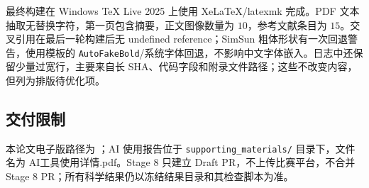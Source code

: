 最终构建在 Windows TeX Live 2025 上使用 XeLaTeX/latexmk 完成。PDF 文本抽取无替换字符，第一页包含摘要，正文图像数量为 $10$，参考文献条目为 $15$。交叉引用在最后一轮构建后无 undefined reference；SimSun 粗体形状有一次回退警告，使用模板的 \texttt{AutoFakeBold}/系统字体回退，不影响中文字体嵌入。日志中还保留少量过宽行，主要来自长 SHA、代码字段和附录文件路径；这些不改变内容，但列为排版待优化项。

\subsection{交付限制}

本论文电子版路径为 ；AI 使用报告位于 \texttt{supporting\_materials/} 目录下，文件名为 AI工具使用详情.pdf。Stage 8 只建立 Draft PR，不上传比赛平台，不合并 Stage 8 PR；所有科学结果仍以冻结结果目录和其检查脚本为准。
